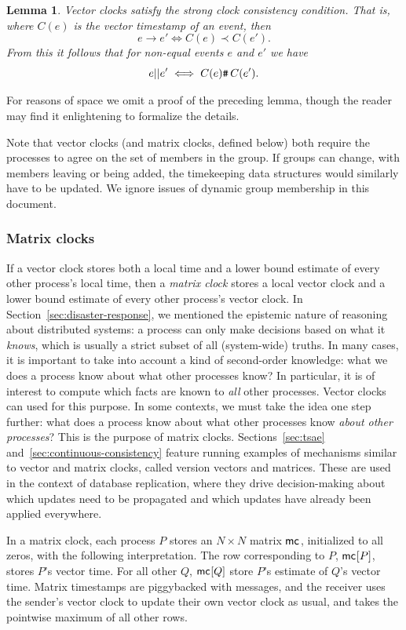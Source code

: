 \documentclass[]             %
{NASA}                       %
\newtheorem{lemma}[theorem]{Lemma}
\theoremstyle{definition}
\begin{document}
\begin{lemma}
  Vector clocks satisfy the strong clock consistency condition. That
  is, where $C(e)$ is the vector timestamp of an event, then
  \[ e \to e' \iff C(e) \prec C(e'). \]
  From this it follows that for non-equal events $e$ and $e'$ we have
  \[e || e' \iff {C(e) \texttt{\#}\,C(e')}. \]%
\end{lemma}

For reasons of space we omit a proof of the preceding lemma, though
the reader may find it enlightening to formalize the details.

Note that vector clocks (and matrix clocks, defined below) both require the processes
to agree on the set of members in the group. If groups can change,
with members leaving or being added, the timekeeping data structures
would similarly have to be updated. We ignore issues of dynamic group
membership in this document.

\subsubsection{Matrix clocks}
\label{sssec:matrix-clocks}
If a vector clock stores both a local time and a lower bound estimate
of every other process's local time, then a \emph{matrix clock} stores a
local vector clock and a lower bound estimate of every other process's
vector clock. In Section~\ref{sec:disaster-response}, we mentioned the epistemic nature of
reasoning about distributed systems: a process can only make decisions
based on what it \emph{knows}, which is usually a strict subset of all
(system-wide) truths. In many cases, it is important to take into
account a kind of second-order knowledge: what we does a process know
about what other processes know? In particular, it is of interest to compute which facts are known to \emph{all} other processes. Vector clocks can used for this purpose. In some contexts, we must take the idea one step further: what does a process know about what other processes know \emph{about other processes}? This is the purpose of matrix clocks. Sections~\ref{sec:tsae} and~\ref{sec:continuous-consistency} feature running examples of mechanisms similar to vector and matrix clocks, called version vectors and matrices. These are used in the context of database replication, where they drive decision-making about which updates need to be propagated and which updates have already been applied everywhere.

In a matrix clock, each process $P$ stores an $N\times{}N$ matrix
$\mathsf{mc}^{}{}{}$, initialized to all zeros, with the following
interpretation. The row corresponding to $P$, $\mathsf{mc}^{}{[P]}{}$,
stores $P$'s vector time. For all other $Q$, $\mathsf{mc}^{}{[Q]}{}$ store $P$'s
estimate of $Q$'s vector time. Matrix timestamps are piggybacked
with messages, and the receiver uses the sender's vector clock to
update their own vector clock as usual, and takes the pointwise
maximum of all other rows.
\end{document}

